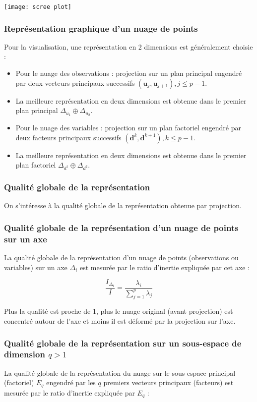 \documentclass[10pt,a4paper]{article}
\begin{document}
\texttt{[image: scree plot]}

\subsubsection*{Représentation graphique d'un nuage de points}
Pour la visualisation, une représentation en 2 dimensions est généralement choisie :
\begin{itemize}
    \item Pour le nuage des observations : projection sur un plan principal engendré par deux vecteurs principaux successifs $(\mathbf{u}_j, \mathbf{u}_{j+1}), j \leq p-1$.
    \item La meilleure représentation en deux dimensions est obtenue dans le premier plan principal $\Delta_{u_1} \oplus \Delta_{u_2}$.
    \item Pour le nuage des variables : projection sur un plan factoriel engendré par deux facteurs principaux successifs $(\mathbf{d}^k, \mathbf{d}^{k+1}), k \leq p-1$.
    \item La meilleure représentation en deux dimensions est obtenue dans le premier plan factoriel $\Delta_{d^1} \oplus \Delta_{d^2}$.
\end{itemize}

\subsubsection*{Qualité globale de la représentation}
On s'intéresse à la qualité globale de la représentation obtenue par projection.

\subsubsection*{Qualité globale de la représentation d'un nuage de points sur un axe}
La qualité globale de la représentation d'un nuage de points (observations ou variables) sur un axe $\Delta_i$ est mesurée par le ratio d'inertie expliquée par cet axe :

\[
\frac{I_{\Delta_i}}{I} = \frac{\lambda_i}{\sum_{j=1}^p \lambda_j}
\]

Plus la qualité est proche de 1, plus le nuage original (avant projection) est concentré autour de l'axe et moins il est déformé par la projection sur l'axe.

\subsubsection*{Qualité globale de la représentation sur un sous-espace de dimension $q > 1$}
La qualité globale de la représentation du nuage sur le sous-espace principal (factoriel) $E_q$ engendré par les $q$ premiers vecteurs principaux (facteurs) est mesurée par le ratio d'inertie expliquée par $E_q$ :
\end{document}
